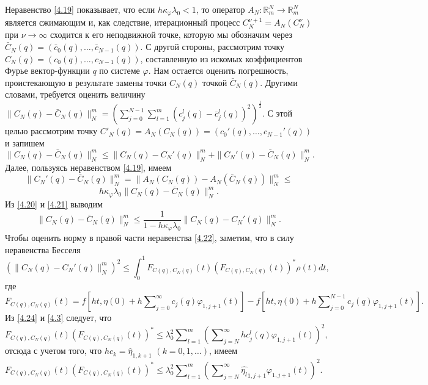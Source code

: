 Неравенство \eqref{4.19} показывает, что если $h\kappa_\varphi\lambda_0<1$, то оператор  $A_N:\mathbb{R}^N_m\to \mathbb{R}^N_m$ является сжимающим и, как следствие, итерационный процесс $C_N^{\nu+1}=A_N(C_N^{\nu})$  при $\nu\to\infty$ сходится к его неподвижной точке, которую мы обозначим через  $\bar C_N(q)=(\bar c_0(q),\ldots,\bar c_{N-1}(q))$. С другой стороны, рассмотрим точку $C_N(q)=(c_0(q),\ldots,c_{N-1}(q))$, составленную из искомых коэффициентов Фурье вектор-функции $q$ по системе $\varphi$. Нам остается оценить погрешность, проистекающую в результате замены точки $C_N(q)$ точкой $\bar C_N(q)$. Другими словами, требуется оценить величину \linebreak
$\|C_N(q)-\bar C_N(q)\|_N^m= \left(\sum_{j=0}^{N-1}\sum\nolimits_{l=1}^m(c_j^l(q)-\bar c_j^l(q))^2\right)^\frac12$. С этой целью рассмотрим точку $C'_N(q)=A_N(C_N(q))=(c_0'(q),\ldots,c_{N-1}'(q))$ и запишем
\begin{equation}\label{4.20}
\|C_N(q)-\bar C_N(q)\|_N^m\le \|C_N(q)- C_N'(q)\|_N^m+\|C_N'(q)-\bar C_N(q)\|_N^m.
\end{equation}
Далее, пользуясь неравенством \eqref{4.19}, имеем
$$
\|C_N'(q)-\bar C_N(q)\|_N^m=\|A_N(C_N(q))-A_N(\bar C_N(q))\|_N^m\le
$$
\begin{equation}\label{4.21}
h\kappa_\varphi\lambda_0\|C_N(q)-\bar C_N(q)\|_N^m.
\end{equation}
Из \eqref{4.20} и \eqref{4.21} выводим
\begin{equation}\label{4.22}
\|C_N(q)-\bar C_N(q)\|_N^m\le \frac1{1-h\kappa_\varphi\lambda_0}\|C_N(q)- C_N'(q)\|_N^m.
\end{equation}
Чтобы оценить норму в правой части неравенства \eqref{4.22}, заметим, что в силу неравенства Бесселя
\begin{equation}\label{4.23}
\left(\|C_N(q)- C_N'(q)\|_N^m\right)^2\le \int_{0}^1F_{C(q),C_N(q)}(t)\left(F_{C(q),C_N(q)}(t)\right)^*\rho(t) dt,
\end{equation}
где
\begin{equation}\label{4.24}
F_{C(q),C_N(q)}(t)=f\left[ht,\eta(0)+ h\sum\nolimits_{j=0}^\infty c_j(q)\varphi_{1,j+1}(t)\right] - f\left[ht,\eta(0)+ h\sum\nolimits_{j=0}^{N-1}c_j(q)\varphi_{1,j+1}(t)\right].
\end{equation}
Из \eqref{4.24} и \eqref{4.3} следует, что
$$
F_{C(q),C_N(q)}(t)(F_{C(q),C_N(q)}(t))^*\le \lambda_0^2 \sum\nolimits_{l=1}^m  \left(\sum\nolimits_{j=N}^\infty hc_j^l(q)\varphi_{1,j+1}(t)\right)^2,
$$
отсюда с учетом того, что $hc_k=\hat \eta_{1,k+1}$ $(k=0,1,\ldots)$, имеем
\begin{equation}\label{4.25}
F_{C(q),C_N(q)}(t)(F_{C(q),C_N(q)}(t))^*\le \lambda_0^2   \sum\nolimits_{l=1}^m \left(\sum\nolimits_{j=N}^\infty  \widehat {\eta_l}_{1,j+1}\varphi_{1,j+1}(t)\right)^2.
\end{equation}
